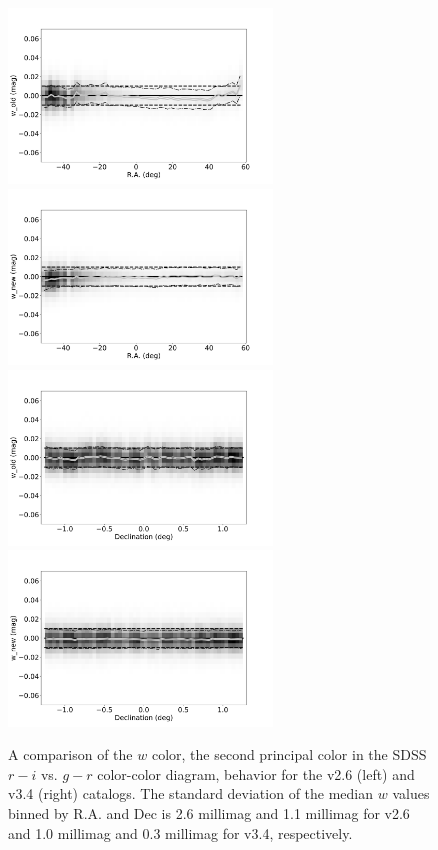 \begin{figure}[th!]
    \centering\includegraphics[width=7cm]{figures/testV26vsV33_r_w_old_RA_Hess.png}
    \centering\includegraphics[width=7cm]{figures/testV26vsV33_r_w_new_RA_Hess.png}
    \centering\includegraphics[width=7cm]{figures/testV26vsV33_r_w_old_Dec_Hess.png}
    \centering\includegraphics[width=7cm]{figures/testV26vsV33_r_w_new_Dec_Hess.png}
\caption{A comparison of the $w$ color, the second principal color in the SDSS
$r-i$ vs. $g-r$ color-color diagram, behavior for the v2.6 (left) and v3.4 (right)
catalogs. The standard deviation of the median $w$ values binned by R.A. and Dec
is 2.6 millimag and 1.1 millimag for v2.6 and 1.0 millimag and 0.3 millimag for v3.4,
respectively.}
\label{fig:comparew} 
\end{figure}
 

